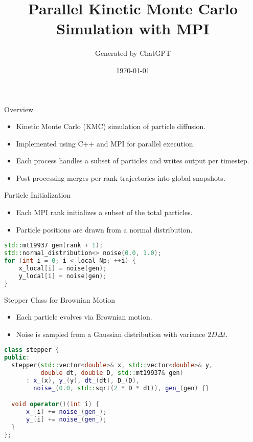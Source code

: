 \documentclass{beamer}
\title{Parallel Kinetic Monte Carlo Simulation with MPI}
\author{Generated by ChatGPT}
\date{\today}
\begin{document}
\frame{\titlepage}

\begin{frame}[fragile]{Overview}
\begin{itemize}
  \item Kinetic Monte Carlo (KMC) simulation of particle diffusion.
  \item Implemented using C++ and MPI for parallel execution.
  \item Each process handles a subset of particles and writes output per timestep.
  \item Post-processing merges per-rank trajectories into global snapshots.
\end{itemize}
\end{frame}

\begin{frame}[fragile]{Particle Initialization}
\begin{itemize}
  \item Each MPI rank initializes a subset of the total particles.
  \item Particle positions are drawn from a normal distribution.
\end{itemize}
\begin{minipage}{\linewidth}\begin{lstlisting}[language=C++]
std::mt19937 gen(rank + 1);
std::normal_distribution<> noise(0.0, 1.0);
for (int i = 0; i < local_Np; ++i) {
    x_local[i] = noise(gen);
    y_local[i] = noise(gen);
}
\end{lstlisting}\end{minipage}
\end{frame}

\begin{frame}[fragile]{Stepper Class for Brownian Motion}
\begin{itemize}
  \item Each particle evolves via Brownian motion.
  \item Noise is sampled from a Gaussian distribution with variance $2D\Delta t$.
\end{itemize}
\begin{minipage}{\linewidth}\begin{lstlisting}[language=C++]
class stepper {
public:
  stepper(std::vector<double>& x, std::vector<double>& y,
          double dt, double D, std::mt19937& gen)
      : x_(x), y_(y), dt_(dt), D_(D),
        noise_(0.0, std::sqrt(2 * D * dt)), gen_(gen) {}

  void operator()(int i) {
      x_[i] += noise_(gen_);
      y_[i] += noise_(gen_);
  }
};
\end{lstlisting}\end{minipage}
\end{frame}
\end{document}
